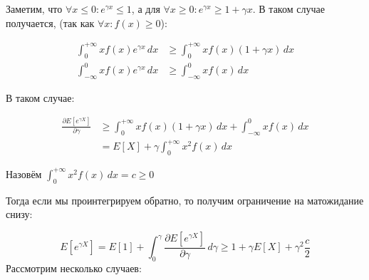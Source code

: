 \documentclass[12pt, a4paper]{article}
\theoremstyle{remark}
\begin{document}
Заметим, что $\forall x \leq 0 : e^{\gamma x} \leq 1$, а для $\forall x \geq 0 : e^{\gamma x} \geq 1 + \gamma x$. В таком случае получается, (так как $\forall x : f(x) \geq 0$): 

\begin{align*}
    \int_{0}^{+\infty} x f(x) e^{\gamma x} \, dx &\geq \int_{0}^{+\infty} x f(x) (1 + \gamma x)\, dx    \\
    \int_{-\infty}^{0} x f(x) e^{\gamma x} \, dx &\geq \int_{-\infty}^{0} x f(x)\, dx    
\end{align*}

В таком случае:

\begin{align*}
\frac{\partial E[e^{\gamma X}]}{\partial \gamma} &\geq  \int_{0}^{+\infty} x f(x) (1 + \gamma x)\, dx + \int_{-\infty}^{0} x f(x)\, dx  \\
&= E[X] + \gamma \int_{0}^{+\infty} x^2 f(x) \, dx
\end{align*}

Назовём $\int_{0}^{+\infty} x^2 f(x) \, dx = c \geq 0$

Тогда если мы проинтегрируем обратно, то получим ограничение на матожидание снизу:

\[
E[e^{\gamma X}] = E[1] + \int_0^\gamma \frac{\partial E[e^{\gamma X}]}{\partial \gamma} \, d\gamma \geq 1 + \gamma E[X] + \gamma^2 \frac{c}{2}    
\]
Рассмотрим несколько случаев:
\end{document}
